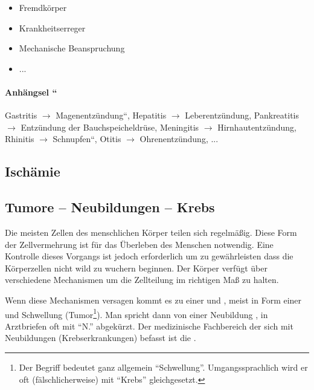 \begin{itemize}
    \item Fremdk\"orper
    \item Krankheitserreger
    \item Mechanische Beanspruchung
    \item ...
\end{itemize}

\paragraph{Anh\"angsel
{\textquotedblleft{}}}
Gastritis ${\rightarrow}$
{\quotedblbase}Magenentz\"undung{\textquotedblleft}, Hepatitis
${\rightarrow}$ Leberentz\"undung, Pankreatitis ${\rightarrow}$
Entz\"undung der Bauchspeicheldr\"use, Meningitis ${\rightarrow}$
Hirnhautentz\"undung, Rhinitis ${\rightarrow}$
{\quotedblbase}Schnupfen{\textquotedblleft}, Otitis ${\rightarrow}$
Ohrenentz\"undung, ...


\subsection{Ischämie}



\subsection{Tumore -- Neubildungen -- Krebs}

\TakeNotes

Die meisten Zellen des menschlichen Körper teilen sich
regelmäßig. Diese Form der Zellvermehrung ist für das
Überleben des Menschen notwendig. Eine Kontrolle dieses
Vorgangs ist jedoch erforderlich um zu gewährleisten dass
die Körperzellen nicht wild zu wuchern beginnen. Der Körper
verfügt über verschiedene Mechanismen um die Zellteilung im
richtigen Maß zu halten. 

Wenn diese Mechanismen versagen kommt es zu einer
 und , meist in Form einer
 und Schwellung (Tumor\footnote{Der Begriff  bedeutet ganz
allgemein "`Schwellung"'. Umgangssprachlich wird er oft
(fälschlicherweise) mit "`Krebs"' gleichgesetzt.}). Man
spricht dann von einer Neubildung , in
Arztbriefen oft mit "`{\ttfamily N.}"' abgekürzt. Der
medizinische Fachbereich der sich mit
Neubildungen (Krebserkrankungen) befasst ist die
.

